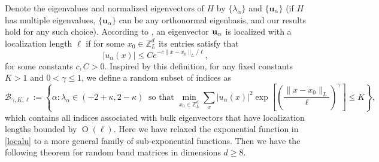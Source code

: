 \documentclass{article}
\newcommand{\1}{\mathds{1}}
\numberwithin{equation}{section}
\newcommand{\bu}{{\bf{u}}}
\newcommand{\al}{\alpha}
\newcommand{\be}{\begin{equation}}
\newcommand{\ee}{\end{equation}}
\renewcommand{\leq}{\leqslant}
\renewcommand{\geq}{\geqslant}
\renewcommand{\le}{\leq}
\renewcommand{\ge}{\geq}
\newcommand{\Z}{\mathbb{Z}}
\DeclareMathOperator{\re}{Re}
\DeclareMathOperator{\im}{Im}
\DeclareMathOperator{\OO}{O}
\DeclareMathOperator{\oo}{o}
\theoremstyle{plain} %
\newtheorem{theorem}{Theorem}[section]
\theoremstyle{remark}
\newcommand{\cor}{\color{red}}
\newcommand{\hty}[1]{{\cor (ht: #1) }}
\begin{document}
Denote the eigenvalues and normalized eigenvectors of $H$ by $\{\lambda_\al\}$ and $\{\mathbf u_\alpha\}$ (if $H$ has multiple eigenvalues, $\{\mathbf u_\alpha\}$ can be any orthonormal eigenbasis, and our results hold for any such choice). According to \cite{Spencer2}, an eigenvector $\bu_\al$ is localized with a localization length $\ell$ if for some $x_0\in \Z_L^d$ its entries satisfy that 
\be\label{localu}  
|  u_\alpha(x) | \le Ce^{-c\|x-x_0\|_L/\ell} ,
\ee
for some constants $c,C>0$. Inspired by this definition, 
for any fixed constants $K>1$ and $0<\gamma \le 1 $, we define a random subset of indices as
$$ {\mathcal B}_{\gamma, K,\ell} :=\left\{\alpha: \lambda_\alpha \in (-2+\kappa, 2-\kappa) \ \text{ so that  } \min_{x_0\in \Z_L^d} \sum_x |  u_\alpha(x)|^2 \exp\left[\left(\frac{\|x-x_0\|_L}{\ell}\right)^\gamma\right] \le K \right\}, $$
which contains all indices associated with bulk eigenvectors that have localization lengths bounded by $\OO(\ell)$. Here we have relaxed the exponential function in \eqref{localu} to a more general family of sub-exponential functions. Then we have the following theorem for random band matrices in dimensions $d\ge 8$. 



\end{document}
